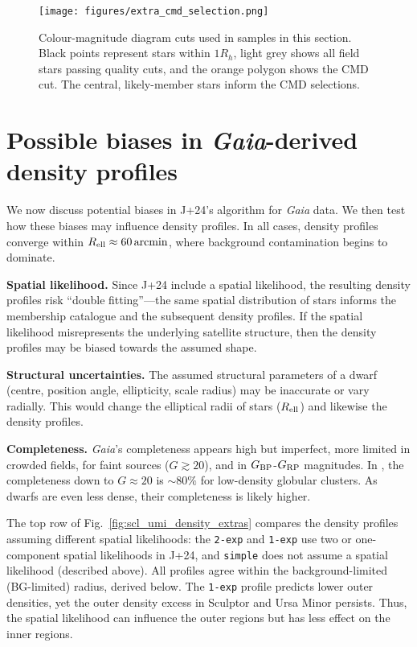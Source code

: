 \begin{figure}
\centering
\texttt{[image: figures/extra\_cmd\_selection.png]}
\caption[Colour-Magnitude sample selection]{Colour-magnitude diagram
cuts used in samples in this section. Black points represent stars
within \(1R_h\), light grey shows all field stars passing quality cuts,
and the orange polygon shows the CMD cut. The central, likely-member
stars inform the CMD selections.}\label{fig:extra_cmd}
\end{figure}

\section{\texorpdfstring{Possible biases in \emph{Gaia}-derived density
profiles}{Possible biases in Gaia-derived density profiles}}\label{sec:density_extra}

We now discuss potential biases in J+24's algorithm for \emph{Gaia}
data. We then test how these biases may influence density profiles. In
all cases, density profiles converge within
\(R_{\rm ell} \approx 60\,{\rm arcmin}\), where background contamination
begins to dominate.

\textbf{Spatial likelihood.} Since J+24 include a spatial likelihood,
the resulting density profiles risk ``double fitting''---the same
spatial distribution of stars informs the membership catalogue and the
subsequent density profiles. If the spatial likelihood misrepresents the
underlying satellite structure, then the density profiles may be biased
towards the assumed shape.

\textbf{Structural uncertainties.} The assumed structural parameters of
a dwarf (centre, position angle, ellipticity, scale radius) may be
inaccurate or vary radially. This would change the elliptical radii of
stars (\(R_{\rm ell}\)) and likewise the density profiles.

\textbf{Completeness.} \emph{Gaia}'s completeness appears high but
imperfect, more limited in crowded fields, for faint sources
(\(G\gtrsim20\)), and in \(G_{\rm BP}\)-\(G_{\rm RP}\) magnitudes. In
\citet{fabricius+2021}, the completeness down to \(G\approx 20\) is
\(\sim 80\%\) for low-density globular clusters. As dwarfs are even less
dense, their completeness is likely higher.

The top row of Fig.~\ref{fig:scl_umi_density_extras} compares the
density profiles assuming different spatial likelihoods: the
\texttt{2-exp} and \texttt{1-exp} use two or one-component spatial
likelihoods in J+24, and \texttt{simple} does not assume a spatial
likelihood (described above). All profiles agree within the
background-limited (BG-limited) radius, derived below. The
\texttt{1-exp} profile predicts lower outer densities, yet the outer
density excess in Sculptor and Ursa Minor persists. Thus, the spatial
likelihood can influence the outer regions but has less effect on the
inner regions.

